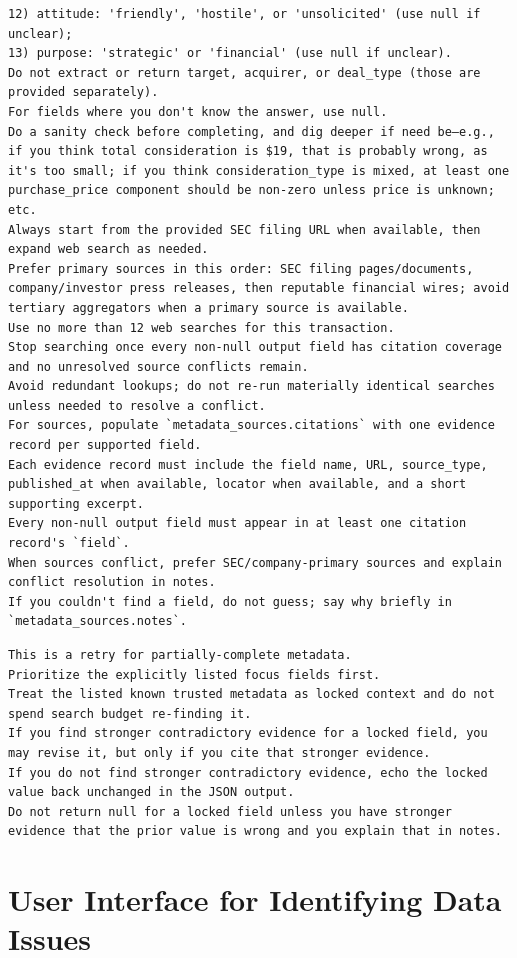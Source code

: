 \documentclass[12pt]{article}
\begin{document}
{\begin{appendices}
\begin{verbatim}
12) attitude: 'friendly', 'hostile', or 'unsolicited' (use null if unclear);
13) purpose: 'strategic' or 'financial' (use null if unclear).
Do not extract or return target, acquirer, or deal_type (those are provided separately).
For fields where you don't know the answer, use null.
Do a sanity check before completing, and dig deeper if need be—e.g., if you think total consideration is $19, that is probably wrong, as it's too small; if you think consideration_type is mixed, at least one purchase_price component should be non-zero unless price is unknown; etc.
Always start from the provided SEC filing URL when available, then expand web search as needed.
Prefer primary sources in this order: SEC filing pages/documents, company/investor press releases, then reputable financial wires; avoid tertiary aggregators when a primary source is available.
Use no more than 12 web searches for this transaction.
Stop searching once every non-null output field has citation coverage and no unresolved source conflicts remain.
Avoid redundant lookups; do not re-run materially identical searches unless needed to resolve a conflict.
For sources, populate `metadata_sources.citations` with one evidence record per supported field.
Each evidence record must include the field name, URL, source_type, published_at when available, locator when available, and a short supporting excerpt.
Every non-null output field must appear in at least one citation record's `field`.
When sources conflict, prefer SEC/company-primary sources and explain conflict resolution in notes.
If you couldn't find a field, do not guess; say why briefly in `metadata_sources.notes`.
\end{verbatim}

\begin{verbatim}
This is a retry for partially-complete metadata.
Prioritize the explicitly listed focus fields first.
Treat the listed known trusted metadata as locked context and do not spend search budget re-finding it.
If you find stronger contradictory evidence for a locked field, you may revise it, but only if you cite that stronger evidence.
If you do not find stronger contradictory evidence, echo the locked value back unchanged in the JSON output.
Do not return null for a locked field unless you have stronger evidence that the prior value is wrong and you explain that in notes.
\end{verbatim}
\endgroup

\section{User Interface for Identifying Data Issues}
\label{app:flag-agreements}


\end{appendices}}
\end{document}
